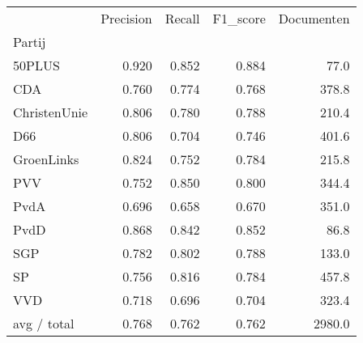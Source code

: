 \begin{tabular}{lrrrr}
\toprule
{} &  Precision &  Recall &  F1\_score &  Documenten \\
Partij       &            &         &           &             \\
\midrule
50PLUS       &      0.920 &   0.852 &     0.884 &        77.0 \\
   CDA       &      0.760 &   0.774 &     0.768 &       378.8 \\
ChristenUnie &      0.806 &   0.780 &     0.788 &       210.4 \\
   D66       &      0.806 &   0.704 &     0.746 &       401.6 \\
  GroenLinks &      0.824 &   0.752 &     0.784 &       215.8 \\
   PVV       &      0.752 &   0.850 &     0.800 &       344.4 \\
  PvdA       &      0.696 &   0.658 &     0.670 &       351.0 \\
  PvdD       &      0.868 &   0.842 &     0.852 &        86.8 \\
   SGP       &      0.782 &   0.802 &     0.788 &       133.0 \\
    SP       &      0.756 &   0.816 &     0.784 &       457.8 \\
   VVD       &      0.718 &   0.696 &     0.704 &       323.4 \\
 avg / total &      0.768 &   0.762 &     0.762 &      2980.0 \\
\bottomrule
\end{tabular}
